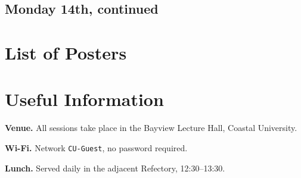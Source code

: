 \documentclass[openany, parskip=full, 12pt, a4paper]{scrbook}
\begin{document}
\section{Monday 14th, continued}

\begin{abstract}{A spectral test for hidden community structure}{%
	P. Anand}{%
	Delta Tech, Bengaluru}{%
	\CTtag}
We propose a spectral statistic, computed from the normalized graph
Laplacian, that distinguishes networks with planted community structure
from Erdős--Rényi null models at sample sizes where modularity-based
tests lose power. The statistic requires no prior estimate of the
number of communities.
\end{abstract}

\begin{abstract}{Delay-coupled oscillators on random graphs}{%
	L. Wei}{%
	Northshore Institute, Shanghai}{%
	\CTtag}
Transmission delays between coupled oscillators are unavoidable in
physically extended networks. We characterise how delay interacts with
random graph topology to produce multistability between in-phase and
splay states, and give an analytic condition, in terms of the graph's
spectral gap, for the in-phase state to remain the unique attractor.
\end{abstract}

\chapter{List of Posters}

\vspace{-1em}


\chapter{Useful Information}

\textbf{Venue.} All sessions take place in the Bayview Lecture Hall,
Coastal University.

\textbf{Wi-Fi.} Network \texttt{CU-Guest}, no password required.

\textbf{Lunch.} Served daily in the adjacent Refectory, 12:30--13:30.
\end{document}
